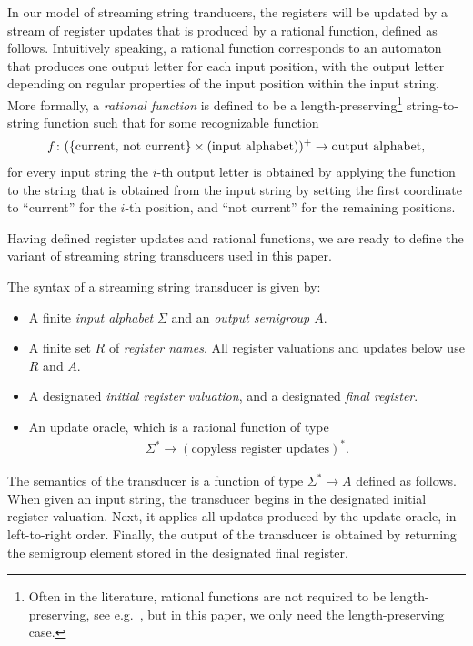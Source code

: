 In our model of streaming string tranducers, the registers will be updated by a stream of register updates that is produced by a {rational function}, defined as follows.  Intuitively speaking, a rational function corresponds to an automaton that produces one output letter for each input position, with the output letter depending on regular properties of the input position within the input string. More formally, a \emph{rational function} is defined to be a length-preserving\footnote{Often in the literature, rational functions are not required to be length-preserving, see e.g.~\cite[p.~525]{sakarovitch2009elements}, but in this paper, we only need the length-preserving case.} string-to-string function such that for some recognizable function 
\begin{align*}
 f\colon (\{\text{current, not current}\} \times \text{(input alphabet)})^+ \to \text{output alphabet},
\end{align*}
for every input string the  $i$-th output letter is obtained by applying the function
to the string that is obtained from the input string by setting the first coordinate to ``current'' for the $i$-th position, and ``not current'' for the remaining positions.  

Having defined register updates and rational functions, we are ready to define the variant of streaming string transducers used in this paper.



\begin{definition}\label{def:usual-sst}
    The syntax of a streaming string transducer is given by:
\begin{itemize}
    \item A finite \emph{input alphabet} $\Sigma$ and an \emph{output semigroup $A$}.
    \item A finite set $R$ of \emph{register names}. All register valuations and updates below use $R$ and $A$.
    \item A designated \emph{initial register valuation}, and a designated \emph{final register}.
    \item An update oracle, which is a rational function of type 
    \begin{align*}
    \Sigma^* \to (\text{copyless register updates})^*.
    \end{align*}
\end{itemize}
\end{definition}

The semantics of the transducer is a function of type $\Sigma^* \to A$ defined as follows. When given an input string, the transducer begins in the designated initial register valuation. Next, it applies all updates produced by the update oracle, in left-to-right order. Finally, the output of the transducer is obtained by returning the semigroup element stored in the designated final register. 

